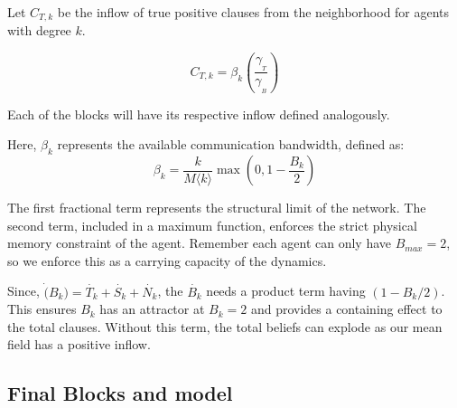 \documentclass[]{article}
\begin{document}
Let $C_{T,k}$ be the inflow of true positive clauses from the neighborhood for agents with degree $k$.

\begin{equation}
	C_{T,k} = \beta_k \left(\frac{\gamma_{\!_T}}{\gamma_{\!_B}}\right) 
\end{equation}

Each of the blocks will have its respective inflow defined analogously.

%
%

Here, $\beta_k$ represents the available communication bandwidth, defined as:
\begin{equation}
	\beta_k = \frac{k}{M \langle k \rangle} \max\left(0, 1 - \frac{B_k}{2}\right)
\end{equation}

The first fractional term represents the structural limit of the network. The second term, included in a maximum function, enforces the strict physical memory constraint of the agent. Remember each agent can only have $B_{max}=2$, so we enforce this as a carrying capacity of the dynamics.

Since, $\dot(B_k)=\dot{T_k}+\dot{S_k}+\dot{N_k}$, the $\dot{B_k}$ needs a product term having $(1-B_k/2)$. This ensures $B_k$ has an attractor at $B_k=2$ and provides a containing effect to the total clauses. Without this term, the total beliefs can explode as our mean field has a positive inflow. 

\subsection{Final Blocks and model}
\end{document}
